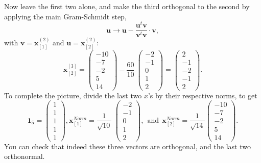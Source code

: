 \documentclass[
]{book}
\begin{document}
Now leave the first two alone, and make the third orthogonal to the second by applying the main Gram-Schmidt step,
\begin{equation}
\mathbf{u} \to \mathbf{u} - \frac{\mathbf{u}^t \mathbf{v}}{\mathbf{v}^t\mathbf{v}} \cdot \mathbf{v},
\label{eq:poly12}
\end{equation}
with \(\mathbf{v}={\mathbf{x}}^{(2)}_{[1]}\) and \(\mathbf{u}={\mathbf{x}}^{(2)}_{[2]}\):
\begin{equation}
\mathbf{x}_{[2]}^{[3]} = 
\begin{pmatrix}-10\\-7\\-2\\5\\14\end{pmatrix} - \frac{60}{10}~\begin{pmatrix}-2\\-1\\0\\1\\2\end{pmatrix}
= \begin{pmatrix}
2\\  -1\\  -2\\ -1\\ 2\end{pmatrix}.
\label{eq:poly13}
\end{equation}
To complete the picture, divide the last two \(x\)'s by their respective norms, to get
\begin{equation}
\mathbf{1}_5=\begin{pmatrix}1\\1\\1\\1\\1\end{pmatrix},
\mathbf{x}^{Norm}_{[1]} = \frac{1}{\sqrt{10}}~\begin{pmatrix}-2\\-1\\0\\1\\2\end{pmatrix},~~\text{and}~~
{\mathbf{x}}^{Norm}_{[2]} = \frac{1}{\sqrt{14}} \begin{pmatrix}-10\\-7\\-2\\5\\14\end{pmatrix}.
\label{eq:poly14}
\end{equation}
You can check that indeed these three vectors are orthogonal, and the last two orthonormal.
\end{document}
